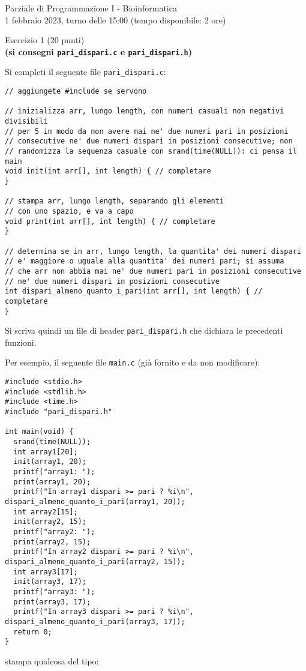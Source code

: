 \documentclass[12pt]{article}
\begin{document}
\begin{center}{\LARGE Parziale di Programmazione I - Bioinformatica}\\
  \large 1 febbraio 2023, turno delle 15:00 (tempo disponibile: 2 ore)
\end{center}

\vspace*{1ex}
\begin{center}{\Large Esercizio 1} ($20$ punti)\\
  \textbf{(si consegni \texttt{pari\_dispari.c} e \texttt{pari\_dispari.h})}
\end{center}

Si completi il seguente file \texttt{pari\_dispari.c}:

\begin{center}
\begin{lstlisting}[language=myC]
// aggiungete #include se servono

// inizializza arr, lungo length, con numeri casuali non negativi divisibili
// per 5 in modo da non avere mai ne' due numeri pari in posizioni
// consecutive ne' due numeri dispari in posizioni consecutive; non
// randomizza la sequenza casuale con srand(time(NULL)): ci pensa il main
void init(int arr[], int length) { // completare
}

// stampa arr, lungo length, separando gli elementi
// con uno spazio, e va a capo
void print(int arr[], int length) { // completare
}

// determina se in arr, lungo length, la quantita' dei numeri dispari
// e' maggiore o uguale alla quantita' dei numeri pari; si assuma
// che arr non abbia mai ne' due numeri pari in posizioni consecutive
// ne' due numeri dispari in posizioni consecutive
int dispari_almeno_quanto_i_pari(int arr[], int length) { // completare
}
\end{lstlisting}
\end{center}
%
Si scriva quindi un file di header \texttt{pari\_dispari.h} che dichiara le precedenti funzioni.

Per esempio, il seguente file \texttt{main.c}
(gi\`a fornito e da non modificare):

\begin{center}
  \begin{lstlisting}[language=myC]
#include <stdio.h>
#include <stdlib.h>
#include <time.h>
#include "pari_dispari.h"

int main(void) {
  srand(time(NULL));
  int array1[20];
  init(array1, 20);
  printf("array1: ");
  print(array1, 20);
  printf("In array1 dispari >= pari ? %i\n", dispari_almeno_quanto_i_pari(array1, 20));
  int array2[15];
  init(array2, 15);
  printf("array2: ");
  print(array2, 15);
  printf("In array2 dispari >= pari ? %i\n", dispari_almeno_quanto_i_pari(array2, 15));
  int array3[17];
  init(array3, 17);
  printf("array3: ");
  print(array3, 17);
  printf("In array3 dispari >= pari ? %i\n", dispari_almeno_quanto_i_pari(array3, 17));
  return 0;
}
  \end{lstlisting}
\end{center}
stampa qualcosa del tipo:
\end{document}
